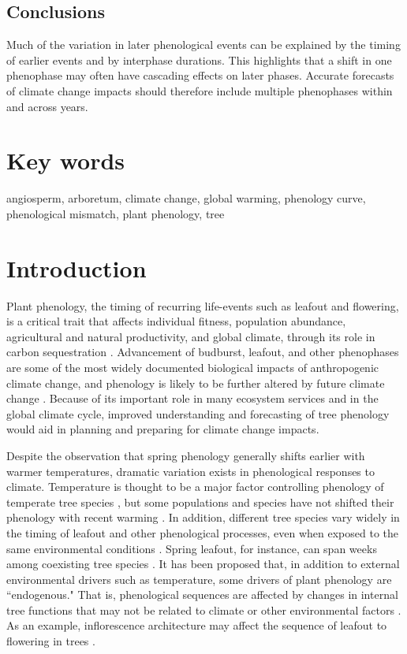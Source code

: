 \documentclass{article}
\begin{document}
\subsection*{Conclusions}
Much of the variation in later phenological events can be explained by the timing of earlier events and by interphase durations. This highlights that a shift in one phenophase may often have cascading effects on later phases. Accurate forecasts of climate change impacts should therefore include multiple phenophases within and across years.

\section* {Key words}
angiosperm, arboretum, climate change, global warming, phenology curve, phenological mismatch, plant phenology, tree 
\section* {Introduction}
Plant phenology, the timing of recurring life-events such as leafout and flowering, is a critical trait that affects individual fitness, population abundance, agricultural and natural productivity, and global climate, through its role in carbon sequestration \citep{chuine2001,cleland2007,willis2010,miller-rushing2010,craine2012}. Advancement of budburst, leafout, and other phenophases are some of the most widely documented biological impacts of anthropogenic climate change, and phenology is likely to be further altered by future climate change \citep{parmesan2006}. Because of its important role in many ecosystem services and in the global climate cycle, improved understanding and forecasting of tree phenology would aid in planning and preparing for climate change impacts.

\par Despite the observation that spring phenology generally shifts earlier with warmer temperatures, dramatic variation exists in phenological responses to climate. Temperature is thought to be a major factor controlling phenology of temperate tree species \citep{parmesan2006,richardson2006,morin2010,schwartz2013,clark2014b}, but some populations and species have not shifted their phenology with recent warming \citep{wolkovich2012}. In addition, different tree species vary widely in the timing of leafout and other phenological processes, even when exposed to the same environmental conditions \citep{lechowicz1984,primack2009c}. Spring leafout, for instance, can span weeks among coexisting tree species \citep{lechowicz1984}. It has been proposed that, in addition to external environmental drivers such as temperature, some drivers of plant phenology are ``endogenous." That is, phenological sequences are affected by changes in internal tree functions that may not be related to climate or other environmental factors \citep{borchert1992,marco2002}. As an example, inflorescence architecture may affect the sequence of leafout to flowering in trees \citep{marco2002}. 
\end{document}
